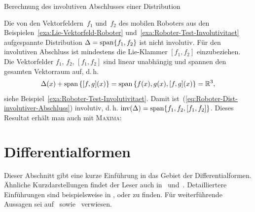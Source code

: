 \begin{algorithm}


\caption{Berechnung des involutiven Abschlusses einer Distribution\label{alg:Involutiver-Abschluss}}

\end{algorithm}

\begin{example}
\label{exa:Roboter-involutiver-Abschluss}Die von den Vektorfeldern~$f_{1}$
und~$f_{2}$ des mobilen Roboters aus den Beispielen~\ref{exa:Lie-Vektorfeld-Roboter}
und~\ref{exa:Roboter-Test-Involutivitaet} aufgespannte Distribution
$\Delta={\operatorname{span}}\{f_{1},f_{2}\}$ ist nicht involutiv. Für den involutiven
Abschluss ist mindestens die Lie-Klammer $[f_{1},f_{2}]$ einzubeziehen.
Die Vektorfelder $f_{1}$, $f_{2}$, $[f_{1},f_{2}]$ sind linear
unabhängig und spannen den gesamten Vektorraum auf, d.\,h. 
\begin{equation}
\Delta(x)+{\operatorname{span}}\left\{ [f,g](x)\right\} ={\operatorname{span}}\left\{ f(x),g(x),[f,g](x)\right\} ={\mathbb{R}}^{3},\label{eq:Roboter-Dist-involutiver-Abschluss}
\end{equation}
siehe Beispiel~\ref{exa:Roboter-Test-Involutivitaet}. Damit ist~(\ref{eq:Roboter-Dist-involutiver-Abschluss})
involutiv, d.\,h. ${\operatorname{inv}}(\Delta)={\operatorname{span}}\{f_{1},f_{2},[f_{1},f_{2}]\}$.
Dieses Resultat erhält man auch mit \textsc{Maxima}:

\begin{maxima}\end{maxima}
\end{example}

\section{Differentialformen\label{sec:Differentialformen}}

Dieser Abschnitt gibt eine kurze Einführung in das Gebiet der Differentialformen.
Ähnliche Kurzdarstellungen findet der Leser auch in~\cite{zeidler2013tb4}
und~\cite[Kapitel~1]{taschner2015band3}. Detailliertere Einführungen
sind beispielsweise in \cite[Kapitel~7]{arnold1989}, \cite{kerner2007}
oder \cite[Anhang~B]{knauf2012} zu finden. Für weiterführende Aussagen
sei auf~\cite{agricola2001,jaenich2005,lee2006} sowie~\cite[Kapitel~12]{sastry1999}
verwiesen.

\medskip{}

